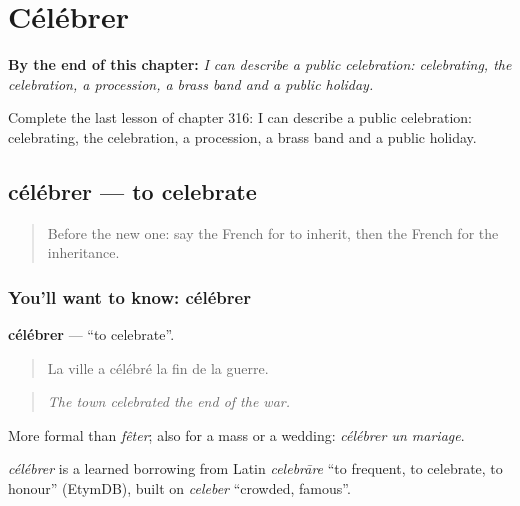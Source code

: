 
\chapter{Célébrer}
\label{ch:fr-celebrer}

\begin{chapteropening}
\textbf{By the end of this chapter:} \emph{I can describe a public celebration: celebrating, the celebration, a procession, a brass band and a public holiday.}

Complete the last lesson of chapter 316: I can describe a public celebration: celebrating, the celebration, a procession, a brass band and a public holiday.
\end{chapteropening}

\section[célébrer]{célébrer — to celebrate}

\label{lesson:FR-C316-celebrer}



\begin{quote}
Before the new one: say the French for to inherit, then the French for the inheritance.
\end{quote}

\subsection*{You'll want to know: célébrer}
\textbf{célébrer} — \textquotedblleft{}to celebrate\textquotedblright{}.

\begin{quote}
La ville a célébré la fin de la guerre.
\end{quote}

\begin{quote}
\emph{The town celebrated the end of the war.}
\end{quote}

More formal than \emph{fêter}; also for a mass or a wedding: \emph{célébrer un mariage}.

\begin{cousinweb}
\emph{célébrer} is a learned borrowing from Latin \emph{celebrāre} \textquotedblleft{}to frequent, to celebrate, to honour\textquotedblright{} (EtymDB), built on \emph{celeber} \textquotedblleft{}crowded, famous\textquotedblright{}.
\end{cousinweb}

